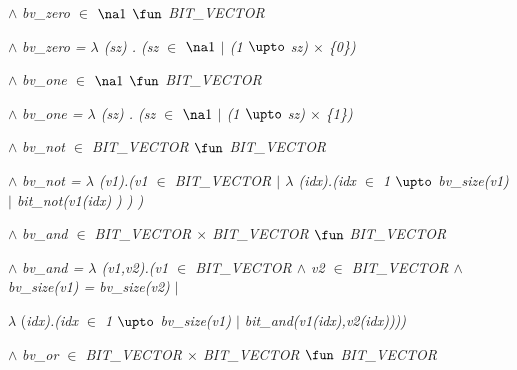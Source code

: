\vspace*{4mm}
\hspace*{0.20in} $\land$  \it bv\_zero  $\in$   $ \na1 $   $\fun$  \it BIT\_VECTOR 

\hspace*{0.20in} $\land$  \it bv\_zero \rm =  $\lambda$ \rm (\it sz\rm ) \rm . \rm (\it sz  $\in$   $ \na1 $   $\mid$  \rm (\rm 1 $\upto$ \it sz\rm )  $\times$  \rm \{\rm 0\rm \}\rm ) 

\vspace*{4mm}
\hspace*{0.20in} $\land$  \it bv\_one  $\in$   $ \na1 $   $\fun$  \it BIT\_VECTOR 

\hspace*{0.20in} $\land$  \it bv\_one \rm =  $\lambda$ \rm (\it sz\rm ) \rm . \rm (\it sz  $\in$   $ \na1 $   $\mid$  \rm (\rm 1 $\upto$ \it sz\rm )  $\times$  \rm \{\rm 1\rm \}\rm ) 

\vspace*{4mm}
\hspace*{0.20in} $\land$  \it bv\_not  $\in$  \it BIT\_VECTOR  $\fun$  \it BIT\_VECTOR 

\hspace*{0.20in} $\land$  \it bv\_not \rm =  $\lambda$ \rm (\it v1\rm )\rm .\rm (\it v1 $\in$  \it BIT\_VECTOR  $\mid$   $\lambda$ \rm (\it idx\rm )\rm .\rm (\it idx  $\in$  \rm 1 $\upto$ \it bv\_size\rm (\it v1\rm ) $\mid$ \it bit\_not\rm (\it v1\rm (\it idx\rm ) \rm ) \rm ) \rm ) 

\vspace*{4mm}
\hspace*{0.20in} $\land$  \it bv\_and  $\in$  \it BIT\_VECTOR  $\times$  \it BIT\_VECTOR  $\fun$  \it BIT\_VECTOR 

\hspace*{0.20in} $\land$  \it bv\_and \rm =  $\lambda$ \rm (\it v1\rm ,\it v2\rm )\rm .\rm (\it v1 $\in$  \it BIT\_VECTOR  $\land$  \it v2  $\in$  \it BIT\_VECTOR  $\land$  \it bv\_size\rm (\it v1\rm ) \rm = \it bv\_size\rm (\it v2\rm ) $\mid$ 

\hspace*{0.80in} $\lambda$ \rm (\it idx\rm )\rm .\rm (\it idx  $\in$  \rm 1 $\upto$ \it bv\_size\rm (\it v1\rm )  $\mid$  \it bit\_and\rm (\it v1\rm (\it idx\rm )\rm ,\it v2\rm (\it idx\rm )\rm )\rm )\rm ) 

\vspace*{4mm}
\hspace*{0.20in} $\land$  \it bv\_or  $\in$  \it BIT\_VECTOR  $\times$  \it BIT\_VECTOR  $\fun$  \it BIT\_VECTOR 

